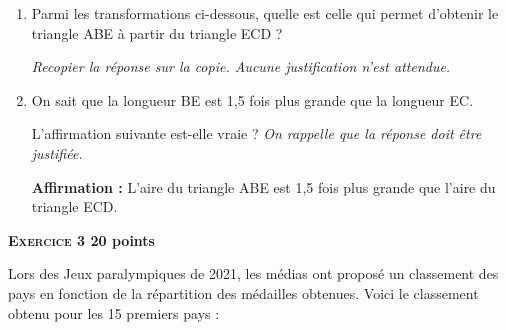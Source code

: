 \documentclass[11pt]{article}
\begin{document}
\begin{enumerate}[resume]
	\item Parmi les transformations ci-dessous, quelle est celle qui permet d’obtenir le triangle ABE à partir du triangle ECD ?

	\emph{Recopier la réponse sur la copie. Aucune justification n’est attendue.}

\begin{center}\quad  {}\quad  {}\quad  {}\quad  {}\end{center}
	\item On sait que la longueur BE est 1,5 fois plus grande que la longueur EC.

L’affirmation suivante est-elle vraie ? \emph{On rappelle que la réponse doit être justifiée.}

	\textbf{Affirmation :} \og L’aire du triangle ABE est 1,5 fois plus grande que l’aire du triangle ECD. \fg{}
\end{enumerate}

\newpage

\textbf{{\large \textsc{Exercice 3}} \hfill 20 points}

\medskip
Lors des Jeux paralympiques de 2021, les médias ont proposé un classement des pays en
fonction de la répartition des médailles obtenues. Voici le classement obtenu pour les 15 premiers pays :
\end{document}
